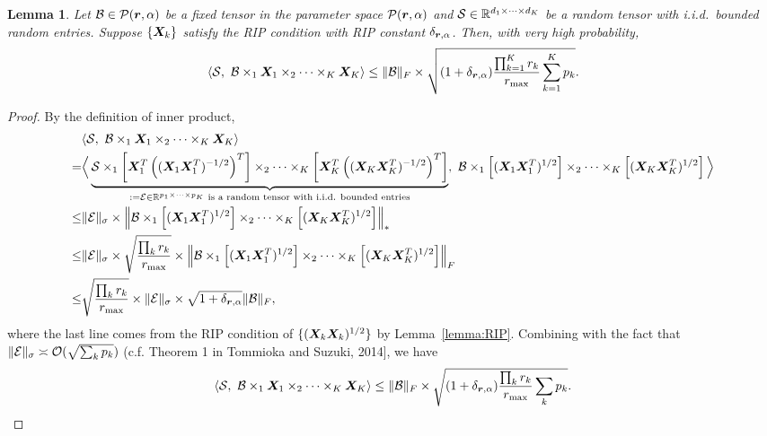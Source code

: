 \documentclass[11pt]{article}
\theoremstyle{plain}
\newtheorem{lem}{Lemma}
\theoremstyle{definition}
\newcommand*{\KeepStyleUnderBrace}[1]{%
  \mathop{%
    \mathchoice
    {\underbrace{\displaystyle#1}}%
    {\underbrace{\textstyle#1}}%
    {\underbrace{\scriptstyle#1}}%
    {\underbrace{\scriptscriptstyle#1}}%
  }\limits
}
\begin{document}
\begin{lem}\label{lem}
Let $\mathcal{B}\in\mathcal{P}(\bm{r},\alpha)$ be a fixed tensor in the parameter space $\mathcal{P}(\bm{r}, \alpha)$ and $\mathcal{S}\in\mathbb{R}^{d_1\times \cdots \times d_K}$ be a random tensor with i.i.d.\ bounded random entries. Suppose $\{\bm X_k\}$ satisfy the RIP condition with RIP constant $\delta_{\bm{r}, \alpha}$. Then, with very high probability,
\[
\langle \mathcal{S},\ \mathcal{B}\times_1\bm X_1\times_2\cdots\times_K\bm X_K \rangle \leq \lVert\mathcal{B}\rVert_F \times\sqrt{ (1+\delta_{\bm{r},\alpha}) {\prod_{k=1}^Kr_k \over r_{\max}}\sum_{k=1}^K p_k}.
\]
\end{lem}
\begin{proof}
By the definition of inner product, 
\begin{align}
&\langle \tS,\ \tB\times_1\mX_1\times_2\cdots\times_K\mX_K \rangle\\
=& \Big\langle \KeepStyleUnderBrace{\tS\times_1\left[\mX_1^T\left((\mX_1\mX^T_1)^{-1/2}\right)^T\right]\times_2\cdots \times_K\left[\mX_K^T\left((\mX_K\mX^T_K)^{-1/2}\right)^T\right]}_{:=\tE\in\mathbb{R}^{p_1\times \cdots\times p_K}\text{ is a random tensor with i.i.d. bounded entries}} ,\ \tB\times_1\left[(\mX_1\mX^T_1)^{1/2}\right]\times_2\cdots\times_K \left[(\mX_K\mX^T_K)^{1/2}\right]\Big \rangle\\
\leq & \snormSize{}{\tE} \times \nnorm{\tB \times_1\left[(\mX_1\mX^T_1)^{1/2}\right]\times_2\cdots\times_K \left[(\mX_K\mX^T_K)^{1/2}\right] } \\
\leq &    \snormSize{}{\tE} \times \sqrt{\prod_k r_k \over r_{\max}}\times \Fnorm{\tB \times_1\left[(\mX_1\mX^T_1)^{1/2}\right]\times_2\cdots\times_K \left[(\mX_K\mX^T_K)^{1/2}\right] }\\
\leq & \sqrt{\prod_k r_k \over r_{\max}}\times  \snormSize{}{\tE}\times \sqrt{1+\delta_{\mr,\alpha}} \FnormSize{}{\tB},
\end{align}
where the last line comes from the RIP condition of $\{(\bm X_k\bm X_k)^{1/2}\}$ by Lemma~\ref{lemma:RIP}. Combining with the fact that $\lVert\mathcal{E}\rVert_\sigma\asymp \mathcal{O}( \sqrt{\sum_k p_k})$ (c.f. Theorem 1 in Tommioka and Suzuki, 2014], we have 
\[
\langle \mathcal{S},\ \mathcal{B}\times_1\bm X_1\times_2\cdots\times_K\bm X_K \rangle\leq \lVert\mathcal{B}\rVert_F\times \sqrt{(1+\delta_{\bm{r},\alpha}){\prod_k r_k \over r_{\max}}\sum_k p_k}.
\] 
\end{proof}
\end{document}
